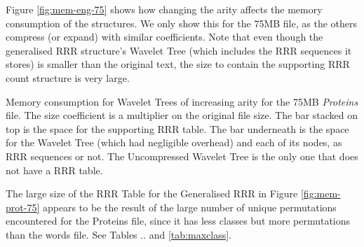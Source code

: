 Figure \ref{fig:mem-eng-75} shows how changing the arity affects the memory
consumption of the structures. We only show this for the 75MB file, as the 
others compress (or expand) with similar coefficients. Note that even though 
the generalised RRR structure's Wavelet Tree (which includes the RRR sequences 
it stores) is smaller than the original text, the size to contain the supporting 
RRR count structure is very large.

			{Memory consumption for Wavelet Trees of increasing arity for
			the 75MB \emph{Proteins} file. The size coefficient is a multiplier
			on the original file size. The bar stacked on top is the space for
			the supporting RRR table. The bar underneath is the space for
			the Wavelet Tree (which had negligible overhead) and each of its
			nodes, as RRR sequences or not. The Uncompressed Wavelet Tree is
			the only one that does not have a RRR table.}

The large size of the RRR Table for the Generalised RRR in Figure 
\ref{fig:mem-prot-75} appears to be the result of the large number of unique
permutations encountered for the Proteins file, since it has less classes but 
more permutations than the words file. See Tables .. and \ref{tab:maxclass}.



